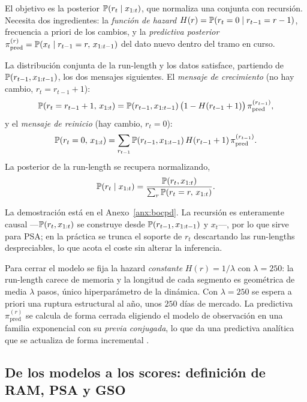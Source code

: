 El objetivo es la posterior $\mathbb{P}(r_t \mid x_{1:t})$, que normaliza una conjunta con recursión. Necesita dos ingredientes: la \emph{función de hazard} $H(r) = \mathbb{P}(r_t = 0 \mid r_{t-1} = r-1)$, frecuencia a priori de los cambios, y la \emph{predictiva posterior} $\pi^{(r)}_{\mathrm{pred}} = \mathbb{P}(x_t \mid r_{t-1} = r,\, x_{1:t-1})$ del dato nuevo dentro del tramo en curso.

\begin{proposicion}
\label{prop:bocpd}
La distribución conjunta de la run-length y los datos satisface, partiendo de $\mathbb{P}(r_{t-1}, x_{1:t-1})$, los dos mensajes siguientes. El \emph{mensaje de crecimiento} (no hay cambio, $r_t = r_{t-1} + 1$):
\[
\mathbb{P}(r_t = r_{t-1} + 1,\, x_{1:t})
= \mathbb{P}(r_{t-1}, x_{1:t-1})\,\big(1 - H(r_{t-1} + 1)\big)\,\pi^{(r_{t-1})}_{\mathrm{pred}},
\]
y el \emph{mensaje de reinicio} (hay cambio, $r_t = 0$):
\[
\mathbb{P}(r_t = 0,\, x_{1:t})
= \sum_{r_{t-1}} \mathbb{P}(r_{t-1}, x_{1:t-1})\, H(r_{t-1} + 1)\, \pi^{(r_{t-1})}_{\mathrm{pred}}.
\]
La posterior de la run-length se recupera normalizando,
\[
\mathbb{P}(r_t \mid x_{1:t}) = \frac{\mathbb{P}(r_t, x_{1:t})}{\sum_{r} \mathbb{P}(r_t = r,\, x_{1:t})}.
\]
\end{proposicion}

La demostración está en el Anexo~\ref{anx:bocpd}. La recursión es enteramente causal —$\mathbb{P}(r_t, x_{1:t})$ se construye desde $\mathbb{P}(r_{t-1}, x_{1:t-1})$ y $x_t$—, por lo que sirve para PSA; en la práctica se trunca el soporte de $r_t$ descartando las run-lengths despreciables, lo que acota el coste sin alterar la inferencia.

Para cerrar el modelo se fija la hazard \emph{constante} $H(r) = 1/\lambda$ con $\lambda = 250$: la run-length carece de memoria y la longitud de cada segmento es geométrica de media $\lambda$ pasos, único hiperparámetro de la dinámica. Con $\lambda = 250$ se espera a priori una ruptura estructural al año, unos $250$ días de mercado. La predictiva $\pi^{(r)}_{\mathrm{pred}}$ se calcula de forma cerrada eligiendo el modelo de observación en una familia exponencial con su \emph{previa conjugada}, lo que da una predictiva analítica que se actualiza de forma incremental \cite{fearnhead2006}.

\subsection{De los modelos a los scores: definición de RAM, PSA y GSO}
\label{sec:strata-aplicado}


